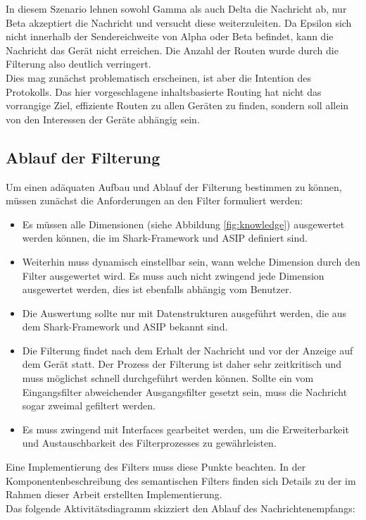 In diesem Szenario lehnen sowohl Gamma als auch Delta die Nachricht ab, nur Beta akzeptiert die Nachricht und versucht diese weiterzuleiten. Da Epsilon sich nicht innerhalb der Sendereichweite von Alpha oder Beta befindet, kann die Nachricht das Gerät nicht erreichen. Die Anzahl der Routen wurde durch die Filterung also deutlich verringert. 
\\Dies mag zunächst problematisch erscheinen, ist aber die Intention des Protokolls. Das hier vorgeschlagene inhaltsbasierte Routing hat nicht das vorrangige Ziel, effiziente Routen zu allen Geräten zu finden, sondern soll allein von den Interessen der Geräte abhängig sein. \newpage
\subsection{Ablauf der Filterung}
\label{subsec:ablaufFilterung}
Um einen adäquaten Aufbau und Ablauf der Filterung bestimmen zu können, müssen zunächst die Anforderungen an den Filter formuliert werden:
\begin{itemize}
	\item Es müssen alle Dimensionen (siehe Abbildung \ref{fig:knowledge}) ausgewertet werden können, die im Shark-Framework und ASIP definiert sind.
	\item Weiterhin muss dynamisch einstellbar sein, wann welche Dimension durch den Filter ausgewertet wird. Es muss auch nicht zwingend jede Dimension ausgewertet werden, dies ist ebenfalls abhängig vom Benutzer.
	\item Die Auswertung sollte nur mit Datenstrukturen ausgeführt werden, die aus dem Shark-Framework und ASIP bekannt sind.
	\item Die Filterung findet nach dem Erhalt der Nachricht und vor der Anzeige auf dem Gerät statt. Der Prozess der Filterung ist daher sehr zeitkritisch und muss möglichst schnell durchgeführt werden können. Sollte ein vom Eingangsfilter abweichender Ausgangsfilter gesetzt sein, muss die Nachricht sogar zweimal gefiltert werden.
	\item Es muss zwingend mit Interfaces gearbeitet werden, um die Erweiterbarkeit und Austauschbarkeit des Filterprozesses zu gewährleisten.
\end{itemize}
Eine Implementierung des Filters muss diese Punkte beachten. In der Komponentenbeschreibung des semantischen Filters finden sich Details zu der im Rahmen dieser Arbeit erstellten Implementierung.
\\Das folgende Aktivitätsdiagramm skizziert den Ablauf des Nachrichtenempfangs:
